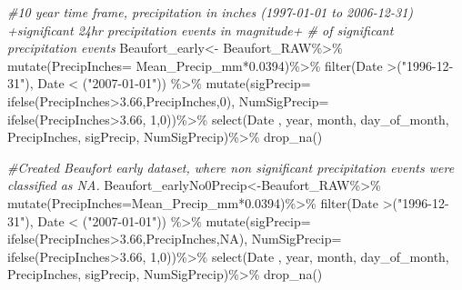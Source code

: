 \documentclass[
  12pt,
]{article}
\newenvironment{Shaded}{\begin{snugshade}}{\end{snugshade}}
\newcommand{\AttributeTok}[1]{\textcolor[rgb]{0.77,0.63,0.00}{#1}}
\newcommand{\CommentTok}[1]{\textcolor[rgb]{0.56,0.35,0.01}{\textit{#1}}}
\newcommand{\ConstantTok}[1]{\textcolor[rgb]{0.00,0.00,0.00}{#1}}
\newcommand{\DecValTok}[1]{\textcolor[rgb]{0.00,0.00,0.81}{#1}}
\newcommand{\FloatTok}[1]{\textcolor[rgb]{0.00,0.00,0.81}{#1}}
\newcommand{\FunctionTok}[1]{\textcolor[rgb]{0.00,0.00,0.00}{#1}}
\newcommand{\NormalTok}[1]{#1}
\newcommand{\OtherTok}[1]{\textcolor[rgb]{0.56,0.35,0.01}{#1}}
\newcommand{\SpecialCharTok}[1]{\textcolor[rgb]{0.00,0.00,0.00}{#1}}
\newcommand{\StringTok}[1]{\textcolor[rgb]{0.31,0.60,0.02}{#1}}
\begin{document}
\begin{Shaded}
\begin{Highlighting}[]
\CommentTok{\#10 year time frame, precipitation in inches (1997{-}01{-}01 to 2006{-}12{-}31) +significant 24hr precipitation events in magnitude+ \# of significant precipitation events}
\NormalTok{Beaufort\_early}\OtherTok{\textless{}{-}}\NormalTok{ Beaufort\_RAW}\SpecialCharTok{\%\textgreater{}\%}
  \FunctionTok{mutate}\NormalTok{(}\AttributeTok{PrecipInches=}\NormalTok{ Mean\_Precip\_mm}\SpecialCharTok{*}\FloatTok{0.0394}\NormalTok{)}\SpecialCharTok{\%\textgreater{}\%}
  \FunctionTok{filter}\NormalTok{(Date }\SpecialCharTok{\textgreater{}}\NormalTok{(}\StringTok{"1996{-}12{-}31"}\NormalTok{), Date }\SpecialCharTok{\textless{}}\NormalTok{ (}\StringTok{"2007{-}01{-}01"}\NormalTok{)) }\SpecialCharTok{\%\textgreater{}\%} 
  \FunctionTok{mutate}\NormalTok{(}\AttributeTok{sigPrecip=} \FunctionTok{ifelse}\NormalTok{(PrecipInches}\SpecialCharTok{\textgreater{}}\FloatTok{3.66}\NormalTok{,PrecipInches,}\DecValTok{0}\NormalTok{),}
         \AttributeTok{NumSigPrecip=} \FunctionTok{ifelse}\NormalTok{(PrecipInches}\SpecialCharTok{\textgreater{}}\FloatTok{3.66}\NormalTok{, }\DecValTok{1}\NormalTok{,}\DecValTok{0}\NormalTok{))}\SpecialCharTok{\%\textgreater{}\%}
  \FunctionTok{select}\NormalTok{(Date , year, month, }
\NormalTok{         day\_of\_month, PrecipInches, sigPrecip, NumSigPrecip)}\SpecialCharTok{\%\textgreater{}\%}
  \FunctionTok{drop\_na}\NormalTok{()}
  
\CommentTok{\#Created Beaufort early dataset, where non significant precipitation events were classified as NA.}
\NormalTok{Beaufort\_earlyNo0Precip}\OtherTok{\textless{}{-}}\NormalTok{Beaufort\_RAW}\SpecialCharTok{\%\textgreater{}\%}
  \FunctionTok{mutate}\NormalTok{(}\AttributeTok{PrecipInches=}\NormalTok{Mean\_Precip\_mm}\SpecialCharTok{*}\FloatTok{0.0394}\NormalTok{)}\SpecialCharTok{\%\textgreater{}\%}
  \FunctionTok{filter}\NormalTok{(Date }\SpecialCharTok{\textgreater{}}\NormalTok{(}\StringTok{"1996{-}12{-}31"}\NormalTok{), Date }\SpecialCharTok{\textless{}}\NormalTok{ (}\StringTok{"2007{-}01{-}01"}\NormalTok{)) }\SpecialCharTok{\%\textgreater{}\%} 
  \FunctionTok{mutate}\NormalTok{(}\AttributeTok{sigPrecip=} \FunctionTok{ifelse}\NormalTok{(PrecipInches}\SpecialCharTok{\textgreater{}}\FloatTok{3.66}\NormalTok{,PrecipInches,}\ConstantTok{NA}\NormalTok{),}
         \AttributeTok{NumSigPrecip=} \FunctionTok{ifelse}\NormalTok{(PrecipInches}\SpecialCharTok{\textgreater{}}\FloatTok{3.66}\NormalTok{, }\DecValTok{1}\NormalTok{,}\DecValTok{0}\NormalTok{))}\SpecialCharTok{\%\textgreater{}\%}
  \FunctionTok{select}\NormalTok{(Date , year, month, }
\NormalTok{         day\_of\_month, PrecipInches, sigPrecip, NumSigPrecip)}\SpecialCharTok{\%\textgreater{}\%}
  \FunctionTok{drop\_na}\NormalTok{()}


\end{Highlighting}
\end{Shaded}
\end{document}
